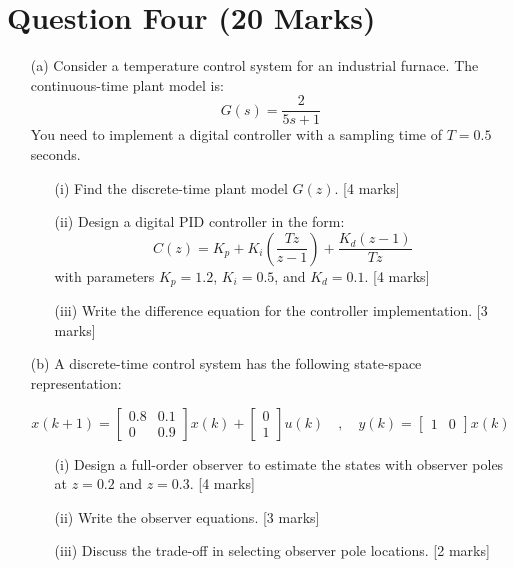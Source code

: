 \documentclass[12pt]{article}
\begin{document}
	
	
	
	\section*{Question Four \hfill (20 Marks)}
	
	\begin{enumerate}
		\item[(a)] Consider a temperature control system for an industrial furnace. The continuous-time plant model is:
		\[
		G(s) = \frac{2}{5s+1}
		\]
		You need to implement a digital controller with a sampling time of \( T = 0.5 \) seconds.
		
		\begin{enumerate}
			\item[(i)] Find the discrete-time plant model \( G(z) \). \hfill [4 marks]
			
			\item[(ii)] Design a digital PID controller in the form:
			\[
			C(z) = K_p + K_i\left( \frac{Tz}{z-1} \right) + \frac{K_d(z-1)}{Tz}
			\]
			with parameters \( K_p = 1.2 \), \( K_i = 0.5 \), and \( K_d = 0.1 \). \hfill [4 marks]
			
			\item[(iii)] Write the difference equation for the controller implementation. \hfill [3 marks]
		\end{enumerate}
		
		\item[(b)] A discrete-time control system has the following state-space representation:
		
		\[
		x(k+1) = 
		\begin{bmatrix}
			0.8 & 0.1 \\
			0 & 0.9
		\end{bmatrix}x(k) +
		\begin{bmatrix}
			0 \\ 1
		\end{bmatrix}u(k)
		\quad , \quad
		y(k) = 
		\begin{bmatrix}
			1 & 0
		\end{bmatrix}x(k)
		\]
		
		\begin{enumerate}
			\item[(i)] Design a full-order observer to estimate the states with observer poles at \( z = 0.2 \) and \( z = 0.3 \). \hfill [4 marks]
			
			\item[(ii)] Write the observer equations. \hfill [3 marks]
			
			\item[(iii)] Discuss the trade-off in selecting observer pole locations. \hfill [2 marks]
		\end{enumerate}
	\end{enumerate}
\end{document}
